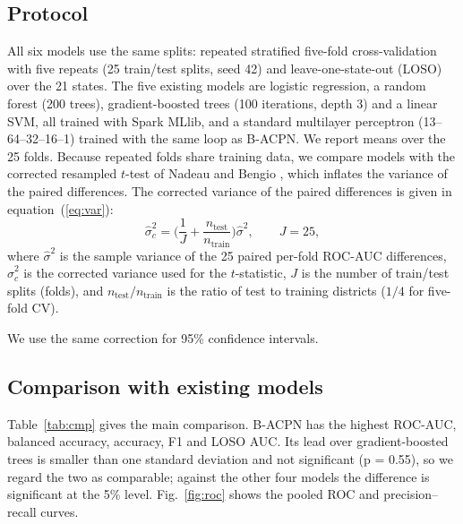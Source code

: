 \documentclass[conference]{IEEEtran}
\begin{document}
\subsection{Protocol}
All six models use the same splits: repeated stratified five-fold cross-validation with five repeats (25 train/test splits, seed 42) and leave-one-state-out (LOSO) over the 21 states. The five existing models are logistic regression, a random forest (200 trees), gradient-boosted trees (100 iterations, depth 3) and a linear SVM, all trained with Spark MLlib, and a standard multilayer perceptron (13--64--32--16--1) trained with the same loop as B-ACPN. We report means over the 25 folds. Because repeated folds share training data, we compare models with the corrected resampled $t$-test of Nadeau and Bengio \cite{nadeau2003}, which inflates the variance of the paired differences. The corrected variance of the paired differences is given in equation~(\ref{eq:var}):
\begin{equation}\label{eq:var}
\hat\sigma^2_{c} = \Big(\frac{1}{J} + \frac{n_{\text{test}}}{n_{\text{train}}}\Big)\hat\sigma^2,\qquad J = 25,
\end{equation}
\noindent where $\hat\sigma^2$ is the sample variance of the 25 paired per-fold ROC-AUC differences, $\hat\sigma^2_{c}$ is the corrected variance used for the $t$-statistic, $J$ is the number of train/test splits (folds), and $n_{\text{test}}/n_{\text{train}}$ is the ratio of test to training districts ($1/4$ for five-fold CV).


We use the same correction for 95\% confidence intervals.

\subsection{Comparison with existing models}
Table~\ref{tab:cmp} gives the main comparison. B-ACPN has the highest ROC-AUC, balanced accuracy, accuracy, F1 and LOSO AUC. Its lead over gradient-boosted trees is smaller than one standard deviation and not significant (p = 0.55), so we regard the two as comparable; against the other four models the difference is significant at the 5\% level. Fig.~\ref{fig:roc} shows the pooled ROC and precision--recall curves.
\end{document}
